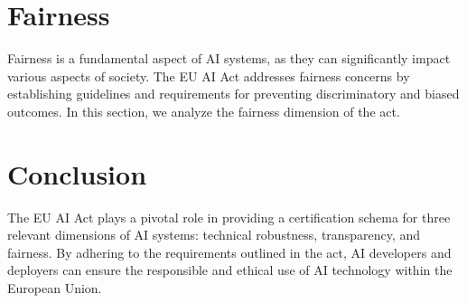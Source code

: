 \documentclass{article}
\begin{document}
\section{Fairness}

Fairness is a fundamental aspect of AI systems, as they can significantly impact various aspects of society. The EU AI Act addresses fairness concerns by establishing guidelines and requirements for preventing discriminatory and biased outcomes. In this section, we analyze the fairness dimension of the act.


\section{Conclusion}

The EU AI Act plays a pivotal role in providing a certification schema for three relevant dimensions of AI systems: technical robustness, transparency, and fairness. By adhering to the requirements outlined in the act, AI developers and deployers can ensure the responsible and ethical use of AI technology within the European Union.





\end{document}
